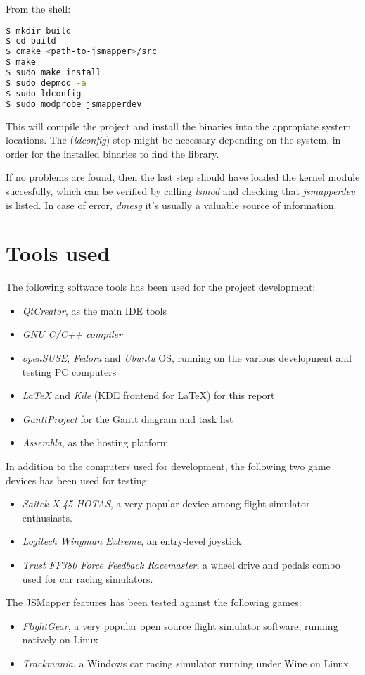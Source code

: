 From the shell:
\begin{lstlisting}[language=bash,caption={Compiling the project},label={lst:jsmapper_build}]
$ mkdir build
$ cd build
$ cmake <path-to-jsmapper>/src 
$ make
$ sudo make install
$ sudo depmod -a
$ sudo ldconfig 
$ sudo modprobe jsmapperdev
\end{lstlisting}

This will compile the project and install the binaries into the appropiate system locations. The (\emph{ldconfig}) step might be necessary depending on the system, in order for the installed binaries to find the library.

If no problems are found, then the last step should have loaded the kernel module succesfully, which can be verified by calling \emph{lsmod} and checking that \emph{jsmapperdev} is listed. In case of error, \emph{dmesg} it's usually a valuable source of information.


\section{Tools used}
The following software tools has been used for the project development:
\begin{itemize}
	\item \emph{QtCreator}, as the main IDE tools
	\item \emph{GNU C/C++ compiler}
	\item \emph{openSUSE}, \emph{Fedora} and \emph{Ubuntu} OS, running on the various development and testing PC computers
	\item \emph{LaTeX} and \emph{Kile} (KDE frontend for LaTeX) for this report
	\item \emph{GanttProject} for the Gantt diagram and task list
	\item \emph{Assembla}, as the hosting platform
\end{itemize}

In addition to the computers used for development, the following two game devices has been used for testing:
\begin{itemize}
	\item \emph{Saitek X-45 HOTAS}, a very popular device among flight simulator enthusiasts.
	\item \emph{Logitech Wingman Extreme}, an entry-level joystick
	\item \emph{Trust FF380 Force Feedback Racemaster}, a wheel drive and pedals combo used for car racing simulators.
\end{itemize}

The JSMapper features has been tested against the following games:
\begin{itemize}
	\item \emph{FlightGear}, a very popular open source flight simulator software, running natively on Linux
	\item \emph{Trackmania}, a Windows car racing simulator running under Wine on Linux.
\end{itemize}
